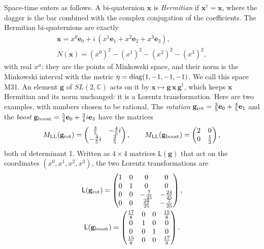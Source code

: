 \documentclass[aps,prd,twocolumn,superscriptaddress,nofootinbib,floatfix,longbibliography]{revtex4-2}
\newcommand{\LL}{{\rm LL}}
\newcommand{\e}[1]{\mathbf e_{#1}}
\begin{document}
Space-time enters as follows. A bi-quaternion $\mathbf x$ is \emph{Hermitian} if $\mathbf x^\dagger=\mathbf x$, where
the dagger is the bar combined with the complex conjugation of the coefficients. The Hermitian bi-quaternions are
exactly
\begin{equation}
\begin{gathered}
\mathbf x=x^0\e0+i\,(x^1\e1+x^2\e2+x^3\e3),\\
N(\mathbf x)=(x^0)^2-(x^1)^2-(x^2)^2-(x^3)^2,
\end{gathered}
\label{eq:m31}
\end{equation}
with real $x^\mu$: they are the points of Minkowski space, and their norm is the Minkowski interval with the metric
$\eta={\rm diag}(1,-1,-1,-1)$. We call this space M31. An element $\mathbf g$ of $SL(2,\mathbb C)$ acts on it by
$\mathbf x\mapsto\mathbf g\,\mathbf x\,\mathbf g^\dagger$, which keeps $\mathbf x$ Hermitian and its norm unchanged: it
is a Lorentz transformation. Here are two examples, with numbers chosen to be rational. The \emph{rotation} $\mathbf
g_{\rm rot}=\tfrac{3}{5}\e{0}+\tfrac{4}{5}\e{1}$ and the \emph{boost} $\mathbf g_{\rm boost}=\tfrac{5}{4}\e{0}+\tfrac{3}{4}i\e{3}$ have the matrices
\begin{equation}
M_\LL(\mathbf g_{\rm rot})=\begin{pmatrix}\tfrac{3}{5}&-\tfrac{4}{5}i\\-\tfrac{4}{5}i&\tfrac{3}{5}\end{pmatrix},\qquad M_\LL(\mathbf g_{\rm boost})=\begin{pmatrix}2&0\\0&\tfrac{1}{2}\end{pmatrix},
\label{eq:Mexamples}
\end{equation}
both of determinant 1. Written as $4\times4$ matrices $\mathsf L(\mathbf g)$ that act on the coordinates
$(x^0,x^1,x^2,x^3)$, the two Lorentz transformations are
\begin{equation}
\begin{gathered}
\mathsf L(\mathbf g_{\rm rot})=\begin{pmatrix}1&0&0&0\\0&1&0&0\\0&0&-\tfrac{7}{25}&-\tfrac{24}{25}\\0&0&\tfrac{24}{25}&-\tfrac{7}{25}\end{pmatrix},\\
\mathsf L(\mathbf g_{\rm boost})=\begin{pmatrix}\tfrac{17}{8}&0&0&\tfrac{15}{8}\\0&1&0&0\\0&0&1&0\\\tfrac{15}{8}&0&0&\tfrac{17}{8}\end{pmatrix}.
\end{gathered}
\label{eq:Lexamples}
\end{equation}
\end{document}
